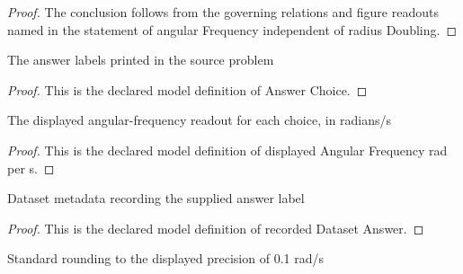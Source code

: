 \begin{proof}
  The conclusion follows from the governing relations and figure readouts named in the statement of angular Frequency independent of radius Doubling.
\end{proof}
\begin{definition}
  \label{def:physics:phyx-mini-0235:phyxminiproblems-problemphyxmini0235-answerchoice}
  The answer labels printed in the source problem
\end{definition}
\begin{proof}
  This is the declared model definition of Answer Choice.
\end{proof}
\begin{definition}
  \label{def:physics:phyx-mini-0235:phyxminiproblems-problemphyxmini0235-displayedangularfrequency-rad-per-s}
  The displayed angular-frequency readout for each choice, in radians/s
\end{definition}
\begin{proof}
  This is the declared model definition of displayed Angular Frequency rad per s.
\end{proof}
\begin{definition}
  \label{def:physics:phyx-mini-0235:phyxminiproblems-problemphyxmini0235-recordeddatasetanswer}
  Dataset metadata recording the supplied answer label
\end{definition}
\begin{proof}
  This is the declared model definition of recorded Dataset Answer.
\end{proof}
\begin{definition}
  \label{def:physics:phyx-mini-0235:phyxminiproblems-problemphyxmini0235-roundstodisplayedtenth}
  Standard rounding to the displayed precision of 0.1 rad/s
\end{definition}
